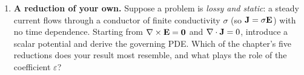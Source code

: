 \begin{enumerate}[nosep]
  \item \textbf{A reduction of your own.} Suppose a problem is \emph{lossy and
  static}: a steady current flows through a conductor of finite conductivity
  $\sigma$ (so $\mathbf{J}=\sigma\mathbf{E}$) with no time dependence. Starting from
  $\nabla\times\mathbf{E}=\mathbf0$ and $\nabla\cdot\mathbf{J}=0$, introduce a scalar potential and derive the
  governing PDE. Which of the chapter's five reductions does your result most
  resemble, and what plays the role of the coefficient $\varepsilon$?
\end{enumerate}
